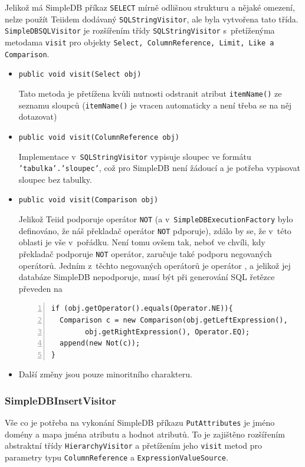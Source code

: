 \documentclass[oneside,12pt]{fithesis2}
\begin{document}
Jelikož má SimpleDB příkaz \texttt{SELECT} mírně odlišnou strukturu a nějaké omezení, nelze použít Teiidem dodávaný \texttt{SQLStringVisitor}, ale byla vytvořena tato třída.
\texttt{SimpleDBSQLVisitor} je rozšířením třídy \texttt{SQLStringVisitor} s~přetíženýma metodama \texttt{visit} pro objekty \texttt{Select, ColumnReference, Limit, Like a Comparison}.
\begin{itemize}
 \item \texttt{public void visit(Select obj)}
 
 Tato metoda je přetížena kvůli nutnosti odstranit atribut \texttt{itemName()} ze seznamu sloupců (\texttt{itemName()} je vracen automaticky a není třeba se na něj dotazovat)
 \item \texttt{public void visit(ColumnReference obj)}
 
 Implementace v~\texttt{SQLStringVisitor} vypisuje sloupec ve formátu \texttt{'tabulka'\allowbreak.'sloupec'}, což pro SimpleDB není žádoucí a je potřeba vypisovat sloupec bez tabulky.
 
 \item \texttt{public void visit(Comparison obj)}
 
 Jelikož Teiid podporuje operátor \texttt{NOT} (a v~\texttt{SimpleDBExecution\allowbreak Factory} bylo definováno, že náš překladač operátor \texttt{NOT} pdporuje), zdálo by se, že v~této oblasti je vše v~pořádku. Není tomu ovšem tak, neboť ve chvíli, kdy překladač podporuje \texttt{NOT} operátor, zaručuje také podporu negovaných operátorů. Jedním z~těchto negovaných operátorů je operátor , a jelikož jej databáze SimpleDB nepodporuje, musí být při generování SQL řetězce převeden na 
 \begin{Verbatim}[fontsize=\small,numbers=left]
if (obj.getOperator().equals(Operator.NE)){
  Comparison c = new Comparison(obj.getLeftExpression(), 
		obj.getRightExpression(), Operator.EQ);
  append(new Not(c));
}
 \end{Verbatim}
\item Další změny jsou pouze minoritního charakteru.
\end{itemize}

\subsubsection*{SimpleDBInsertVisitor}
Vše co je potřeba na vykonání SimpleDB příkazu \texttt{PutAttributes} je jméno domény a mapa jména atributu a hodnot atributů. To je zajištěno rozšířením abstraktní třídy \texttt{HierarchyVisitor} a přetížením jeho \texttt{visit} metod pro parametry typu \texttt{ColumnReference} a \texttt{ExpressionValueSource}.
\end{document}

